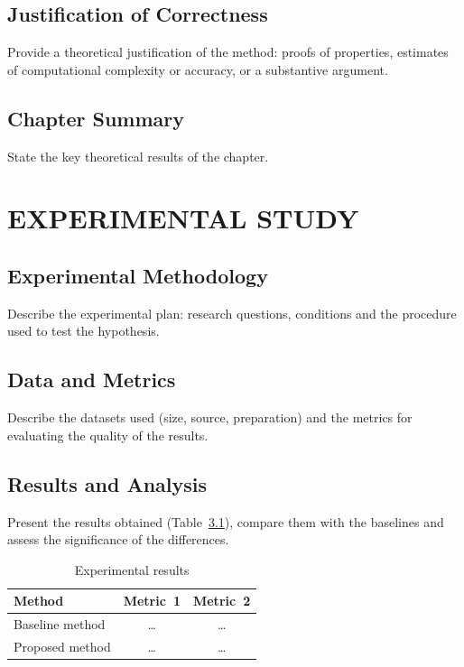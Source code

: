 \documentclass[12pt,a4paper]{extreport}
\begin{document}
\section{Justification of Correctness}
Provide a theoretical justification of the method: proofs of properties,
estimates of computational complexity or accuracy, or a substantive argument.

\section{Chapter Summary}
State the key theoretical results of the chapter.

\clearpage

\chapter{EXPERIMENTAL STUDY}
\section{Experimental Methodology}
Describe the experimental plan: research questions, conditions and the
procedure used to test the hypothesis.

\section{Data and Metrics}
Describe the datasets used (size, source, preparation) and the metrics for
evaluating the quality of the results.

\section{Results and Analysis}
Present the results obtained (Table~\ref{tab:results}), compare them with the
baselines and assess the significance of the differences.

\begin{table}[H]
\caption{Experimental results}
\label{tab:results}
\centering
\begin{tabular}{|>{\raggedright\arraybackslash}p{5cm}|c|c|}
\hline
\textbf{Method} & \textbf{Metric~1} & \textbf{Metric~2} \\
\hline
Baseline method  & \ldots & \ldots \\
\hline
Proposed method  & \ldots & \ldots \\
\hline
\end{tabular}
\end{table}
\end{document}
